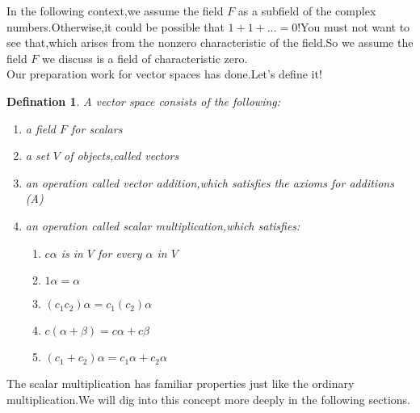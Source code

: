 \documentclass{article}
\begin{document}
\indent In the following context,we assume the field $F$ as a subfield of the complex numbers.Otherwise,it could be possible that $1+1+\dots =0$!You must not want to see that,which arises from the nonzero characteristic of the field.So we assume the field $F$ we discuss is a field of characteristic zero.\\
\indent Our preparation work for vector spaces has done.Let's define it!
\theoremstyle{defination}\newtheorem{dde}{Defination}[section]
\begin{dde}
	A vector space consists of the following:
	\begin{enumerate}
		\item a field $F$ for scalars
		\item a set $V$ of objects,called vectors
		\item an operation called vector addition,which satisfies the axioms for additions (A)
		\item an operation called scalar multiplication,which satisfies:
		\begin{enumerate}
			\item[(a)] $c\alpha$ is in $V$ for every $\alpha$ in $V$
			\item[(b)] $1\alpha=\alpha$
			\item[(c)] $(c_1c_2)\alpha=c_1(c_2)\alpha$
			\item[(d)] $c(\alpha+\beta)=c\alpha+c\beta$
			\item[(e)] $(c_1+c_2)\alpha=c_1\alpha+c_2\alpha$
		\end{enumerate}
	\end{enumerate}
\end{dde}
The scalar multiplication has familiar properties just like the ordinary multiplication.We will dig into this concept more deeply in the following sections.
\end{document}
